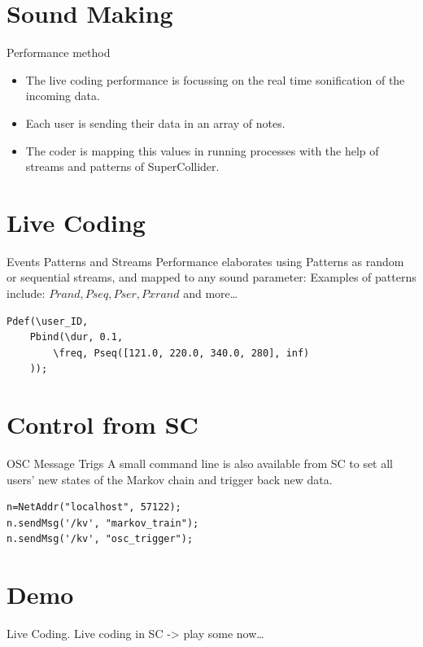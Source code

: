 \documentclass[t, 10pt, seahorse, bigger]{beamer}
\begin{document}
\section{Sound Making}
\label{sec:orgda8bea6}
\begin{frame}[label={sec:org906865b}]{Performance method}
\begin{itemize}
\item The live coding performance is focussing on the real time sonification of the incoming data.
\item Each user is sending their data in an array of notes.
\item The coder is mapping this values in running processes with the help of streams and patterns of SuperCollider.
\end{itemize}
\end{frame}
\section{Live Coding}
\label{sec:org7fe8c37}
\begin{frame}[label={sec:org6eefa31},fragile]{Events Patterns and Streams}
 Performance elaborates using Patterns as random or sequential streams, and mapped to any sound parameter:
Examples of patterns include:
\(Prand, Pseq, Pser, Pxrand\)
and more\ldots{}

\begin{verbatim}
Pdef(\user_ID,
	Pbind(\dur, 0.1,
		\freq, Pseq([121.0, 220.0, 340.0, 280], inf)
	));
\end{verbatim}
\end{frame}
\section{Control from SC}
\label{sec:org312e4ec}
\begin{frame}[label={sec:orge8c45c9},fragile]{OSC Message Trigs}
 A small command line is also available from SC to set all users' new states of the Markov chain and trigger back new data.
\begin{verbatim}
n=NetAddr("localhost", 57122);
n.sendMsg('/kv', "markov_train");
n.sendMsg('/kv', "osc_trigger");
\end{verbatim}
\end{frame}
\section{Demo}
\label{sec:org084bc38}
\begin{frame}[label={sec:org9f7fb11}]{Live Coding.}
Live coding in SC -> play some now\ldots{}
\end{frame}
\end{document}
